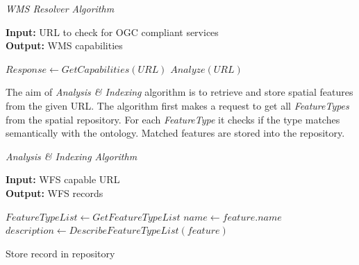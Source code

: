 \newline
\begin{algorithm}[H]
    \caption{\em WMS Resolver Algorithm }
    \textbf{Input:} URL to check for OGC compliant services \\
	\textbf{Output:} WMS capabilities
	
	\begin{algorithmic}[1]
    \State $Response \gets GetCapabilities(URL)$
        \State $Analyze(URL)$
    \ENDIF
    \end{algorithmic}
\end{algorithm}
\par The aim of \textit{Analysis \& Indexing} algorithm is to retrieve and store spatial features from the given URL. The algorithm first makes a request to get all \textit{FeatureTypes} from the spatial repository. For each \textit{FeatureType} it checks if the type matches semantically with the ontology. Matched features are stored into the repository.
\newline
\begin{algorithm}[H]
    \caption{\em Analysis \& Indexing Algorithm }
    \textbf{Input:} WFS capable URL \\
	\textbf{Output:} WFS records
	
	\begin{algorithmic}[1]
	    \State $FeatureTypeList \gets GetFeatureTypeList$
	        \State $name \gets feature.name$
	        \State $description \gets DescribeFeatureTypeList(feature)$
	        
	            \State Store record in repository
	        \ENDIF
	        
	    \ENDFOR
	\end{algorithmic}
\end{algorithm}

